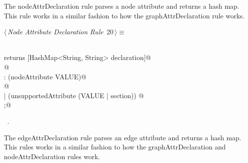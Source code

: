 \documentclass[a4paper]{report}
\begin{document}
The nodeAttrDeclaration rule parses a node attribute and returns a hash map. This rule works in a similar fashion to how the graphAttrDeclaration rule works.
\begin{flushleft} \small
\begin{minipage}{\linewidth}\label{scrap20}\raggedright\small
{} $\langle\,${\itshape Node Attribute Declaration Rule}\nobreak\ {\footnotesize {20}}$\,\rangle\equiv$
\vspace{-1ex}
\begin{list}{}{} \item
\mbox{}\verb@@\\
\mbox{}\verb@nodeAttrDeclaration returns [HashMap<String, String> declaration]@\\
\mbox{}@\\
\mbox{}\verb@: (nodeAttribute VALUE)@\\
\mbox{} @\\
\mbox{}\verb@| (unsupportedAttribute (VALUE | section)) @\\
\mbox{};@\\
\mbox{}\verb@@{\NWsep}
\end{list}
\vspace{-1.5ex}
\footnotesize
\begin{list}{}{\setlength{\itemsep}{-\parsep}\setlength{\itemindent}{-\leftmargin}}
\item \NWtxtMacroRefIn\ .

\item{}
\end{list}
\end{minipage}\vspace{4ex}
\end{flushleft}
The edgeAttrDeclaration rule parses an edge attribute and returns a hash map. This rules works in a similar fashion to how the graphAttrDeclaration and nodeAttrDeclaration rules work.
\end{document}
